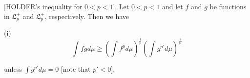 [HOLDER's inequality for $0 < p < 1$]. Let $0 < p < 1$ and let $f$ and $g$ be functions in $\mathfrak{L}_p^+$ and $\mathfrak{L}_p^+$, respectively. Then we have

(i) $$\int f g d\mu \geq \left( \int f^p d\mu \right)^{\frac{1}{p}} \left( \int g^{p'} d\mu \right)^{\frac{1}{p'}}$$

unless $\int g^{p'} d\mu = 0$ [note that $p' < 0$].